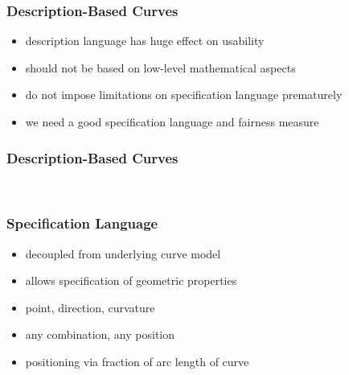 \documentclass[mathserif]{beamer}
\begin{document}
		\begin{frame}
			\frametitle{Description-Based Curves}
			\begin{itemize}
				\item description language has huge effect on usability
				\item should not be based on low-level mathematical aspects %
				\item do not impose limitations on specification language prematurely %
				\item we need a good specification language and fairness measure
			\end{itemize}
		\end{frame}
	
		\begin{frame}
			\frametitle{Description-Based Curves}
			\\
		\end{frame}
		
		\begin{frame}
			\frametitle{Specification Language}
			\begin{itemize}
				\item decoupled from underlying curve model
				\item allows specification of geometric properties
				\item point, direction, curvature
				\item any combination, any position
				\item positioning via fraction of arc length of curve
			\end{itemize}
		\end{frame}
\end{document}

